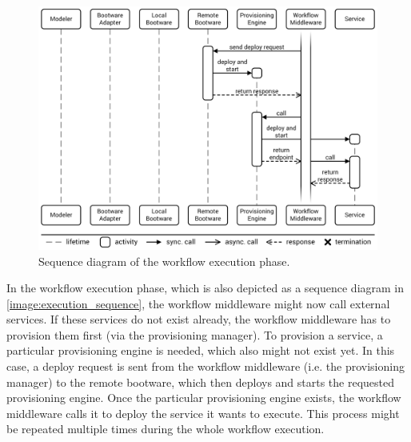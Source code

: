 \begin{figure}[!htbp]
	\centering
	\includegraphics[resolution=600]{process/assets/workflow_execution_sequence}
	\caption{Sequence diagram of the workflow execution phase.}
	\label{image:execution_sequence}
\end{figure}

In the workflow execution phase, which is also depicted as a sequence diagram in \autoref{image:execution_sequence}, the workflow middleware might now call external services.
If these services do not exist already, the workflow middleware has to provision them first (via the provisioning manager).
To provision a service, a particular provisioning engine is needed, which also might not exist yet.
In this case, a deploy request is sent from the workflow middleware (i.e. the provisioning manager) to the remote bootware, which then deploys and starts the requested provisioning engine.
Once the particular provisioning engine exists, the workflow middleware calls it to deploy the service it wants to execute.
This process might be repeated multiple times during the whole workflow execution.

